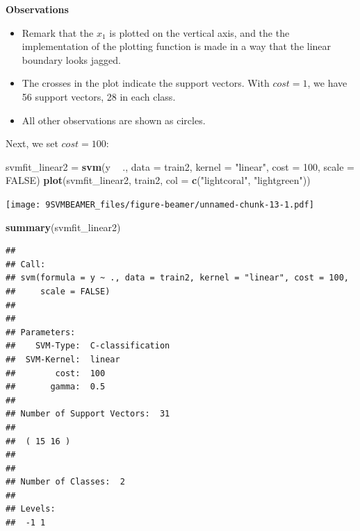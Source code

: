 \documentclass[ignorenonframetext,]{beamer}
\newenvironment{Shaded}{\begin{snugshade}}{\end{snugshade}}
\newcommand{\KeywordTok}[1]{\textcolor[rgb]{0.13,0.29,0.53}{\textbf{#1}}}
\newcommand{\DataTypeTok}[1]{\textcolor[rgb]{0.13,0.29,0.53}{#1}}
\newcommand{\DecValTok}[1]{\textcolor[rgb]{0.00,0.00,0.81}{#1}}
\newcommand{\StringTok}[1]{\textcolor[rgb]{0.31,0.60,0.02}{#1}}
\newcommand{\OtherTok}[1]{\textcolor[rgb]{0.56,0.35,0.01}{#1}}
\newcommand{\OperatorTok}[1]{\textcolor[rgb]{0.81,0.36,0.00}{\textbf{#1}}}
\newcommand{\NormalTok}[1]{#1}
\providecommand{\tightlist}{%
  \setlength{\itemsep}{0pt}\setlength{\parskip}{0pt}}
\begin{document}
\begin{frame}

\textbf{Observations}

\begin{itemize}
\tightlist
\item
  Remark that the \(x_1\) is plotted on the vertical axis, and the the
  implementation of the plotting function is made in a way that the
  linear boundary looks jagged.
\item
  The crosses in the plot indicate the support vectors. With \(cost=1\),
  we have 56 support vectors, 28 in each class.
\item
  All other observations are shown as circles.
\end{itemize}

\end{frame}

\begin{frame}[fragile]

Next, we set \(cost=100\): \footnotesize

\begin{Shaded}
\begin{Highlighting}[]
\NormalTok{svmfit_linear2 =}\StringTok{ }\KeywordTok{svm}\NormalTok{(y }\OperatorTok{~}\StringTok{ }\NormalTok{., }\DataTypeTok{data =}\NormalTok{ train2, }\DataTypeTok{kernel =} \StringTok{"linear"}\NormalTok{, }\DataTypeTok{cost =} \DecValTok{100}\NormalTok{, }
    \DataTypeTok{scale =} \OtherTok{FALSE}\NormalTok{)}
\KeywordTok{plot}\NormalTok{(svmfit_linear2, train2, }\DataTypeTok{col =} \KeywordTok{c}\NormalTok{(}\StringTok{"lightcoral"}\NormalTok{, }\StringTok{"lightgreen"}\NormalTok{))}
\end{Highlighting}
\end{Shaded}

\texttt{[image: 9SVMBEAMER\_files/figure-beamer/unnamed-chunk-13-1.pdf]}

\begin{Shaded}
\begin{Highlighting}[]
\KeywordTok{summary}\NormalTok{(svmfit_linear2)}
\end{Highlighting}
\end{Shaded}

\begin{verbatim}
## 
## Call:
## svm(formula = y ~ ., data = train2, kernel = "linear", cost = 100, 
##     scale = FALSE)
## 
## 
## Parameters:
##    SVM-Type:  C-classification 
##  SVM-Kernel:  linear 
##        cost:  100 
##       gamma:  0.5 
## 
## Number of Support Vectors:  31
## 
##  ( 15 16 )
## 
## 
## Number of Classes:  2 
## 
## Levels: 
##  -1 1
\end{verbatim}

\normalsize

\end{frame}
\end{document}
